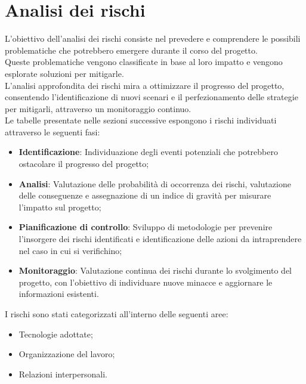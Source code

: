 \nonstopmode
\pagebreak
\section{Analisi dei rischi}
L'obiettivo dell'analisi dei rischi consiste nel prevedere e comprendere
le possibili problematiche che potrebbero emergere durante il corso del progetto. \\
Queste problematiche vengono classificate in base al loro impatto e vengono esplorate soluzioni per mitigarle.\\
L'analisi approfondita dei rischi mira a ottimizzare il progresso del progetto, consentendo l'identificazione di nuovi scenari e il perfezionamento
delle strategie per mitigarli, attraverso un monitoraggio continuo. \\

Le tabelle presentate nelle sezioni successive espongono i rischi individuati attraverso
le seguenti fasi:
\begin{itemize}
    \item \textbf{Identificazione}: Individuazione degli eventi potenziali che potrebbero ostacolare il progresso del progetto;
    \item \textbf{Analisi}: Valutazione delle probabilità di occorrenza dei rischi, valutazione delle conseguenze e assegnazione di un indice di gravità per misurare l'impatto sul progetto;
    \item \textbf{Pianificazione di controllo}: Sviluppo di metodologie per prevenire l'insorgere dei rischi identificati e identificazione delle azioni da intraprendere nel caso in cui si verifichino;
    \item \textbf{Monitoraggio}: Valutazione continua dei rischi durante lo svolgimento del progetto, con l'obiettivo di individuare nuove minacce e aggiornare le informazioni esistenti.
\end{itemize}

I rischi sono stati categorizzati all'interno delle seguenti aree:
\begin{itemize}
    \item Tecnologie adottate;
    \item Organizzazione del lavoro;
    \item Relazioni interpersonali.
\end{itemize}
